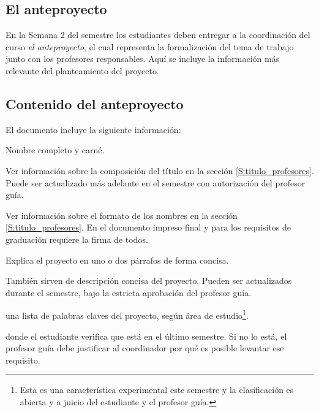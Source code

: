 % 

\begin{center}
\section*{El anteproyecto}
\end{center}

En la Semana 2 del semestre los estudiantes deben entregar a la coordinación del curso \emph{el anteproyecto}, el cual representa la formalización del tema de trabajo junto con los profesores responsables. Aquí se incluye la información más relevante del planteamiento del proyecto. 

\subsection*{Contenido del anteproyecto}

El documento incluye la siguiente información:

\begin{description}\ajustado
\item[Identificación del estudiante] Nombre completo y carné.
\item[Título del proyecto] Ver información sobre la composición del título en la sección \ref{S:titulo_profesores}. Puede ser actualizado más adelante en el semestre con autorización del profesor guía.
\item[Nombre de los profesores guías y lectores] Ver información sobre el formato de los nombres en la sección \ref{S:titulo_profesores}. En el documento impreso final y para los requisitos de graduación requiere la firma de todos. 
\item[Descripción] Explica el proyecto en uno o dos párrafos de forma concisa.
\item[Objetivos] También sirven de descripción concisa del proyecto. Pueden ser actualizados durante el semestre, bajo la estricta aprobación del profesor guía.
\item[Clasificación temática] una lista de palabras claves del proyecto, según área de estudio\footnote{Esta es una característica experimental este semestre y la clasificación es abierta y a juicio del estudiante y el profesor guía.}.
\item[Declaración de último semestre] donde el estudiante verifica que está en el último semestre. Si no lo está, el profesor guía debe justificar al coordinador por qué es posible levantar ese requisito.
\end{description}

